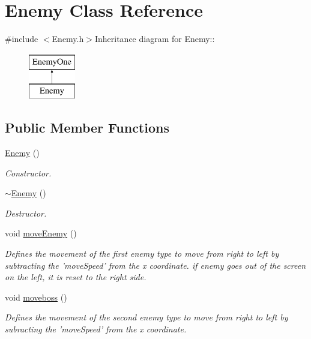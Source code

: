 \hypertarget{classEnemy}{
\section{Enemy Class Reference}
\label{classEnemy}
}


{\ttfamily \#include $<$Enemy.h$>$}Inheritance diagram for Enemy::\begin{figure}[H]
\begin{center}
\leavevmode
\includegraphics[height=2cm]{classEnemy}
\end{center}
\end{figure}
\subsection*{Public Member Functions}
\begin{DoxyCompactItemize}
\item 
\hyperlink{classEnemy_a94f30d348b6d2840fd71675472ba38dd}{Enemy} ()
\begin{DoxyCompactList}\small\item\em Constructor. \item\end{DoxyCompactList}\item 
\hyperlink{classEnemy_ac0eec4755e28c02688065f9657150ac3}{$\sim$Enemy} ()
\begin{DoxyCompactList}\small\item\em Destructor. \item\end{DoxyCompactList}\item 
void \hyperlink{classEnemy_a0dcca8a418323526c286c323a3fb2fd1}{moveEnemy} ()
\begin{DoxyCompactList}\small\item\em Defines the movement of the first enemy type to move from right to left by subtracting the 'moveSpeed' from the x coordinate. if enemy goes out of the screen on the left, it is reset to the right side. \item\end{DoxyCompactList}\item 
void \hyperlink{classEnemy_a405168f47abea55981313377385d6c37}{moveboss} ()
\begin{DoxyCompactList}\small\item\em Defines the movement of the second enemy type to move from right to left by subracting the 'moveSpeed' from the x coordinate. \item\end{DoxyCompactList}\end{DoxyCompactItemize}
